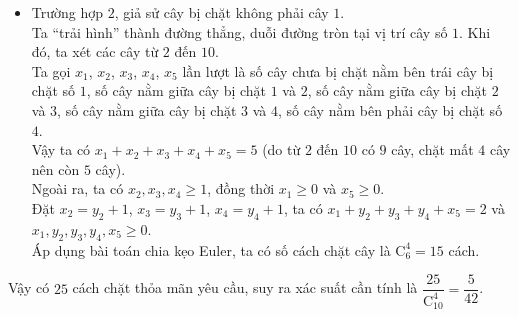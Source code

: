 \begin{ex}
{\begin{itemize}
			Gọi $x_1$, $x_2$, $x_3$, $x_4$ lần lượt là số lượng cây nằm ở giữa bốn cây bị chặt (chưa bao gồm cây $2$ và cây $10$). \\
			Vậy ta có $x_1+x_2+x_3+x_4=4$. Đồng thời $x_1\ge 0$, $x_2\ge 1$, $x_3\ge 1$ và $x_4\ge 0$ (do đã có cây $2$ và cây $10$ đứng cạnh cây $1$ bị chặt, nên $x_1$ và $x_4$ có thể bằng $0$ vẫn thỏa mãn yêu cầu đề bài). \\ 
			Đặt $x_2=y_2+1$, $x_3=y_3+1$, suy ra $x_1+y_2+y_3+x_4=2$ và $x_1,  y_2, y_3, x_4\ge 0$. \\
			Áp dụng bài toán chia kẹo Euler, ta có số cách chặt là $\mathrm{C}^3_5=10$ cách.
			\item Trường hợp $2$, giả sử cây bị chặt không phải cây $1$. \\
			Ta ``trải hình'' thành đường thẳng, duỗi đường tròn tại vị trí cây số $1$. Khi đó, ta xét các cây từ $2$ đến $10$. \\
			Ta gọi $x_1$, $x_2$, $x_3$, $x_4$, $x_5$ lần lượt là số cây chưa bị chặt nằm bên trái cây bị chặt số $1$, số cây nằm giữa cây bị chặt $1$ và $2$, số cây nằm giữa cây bị chặt $2$ và $3$, số cây nằm giữa cây bị chặt $3$ và $4$, số cây nằm bên phải cây bị chặt số $4$. \\
			Vậy ta có $x_1+x_2+x_3+x_4+x_5=5$ (do từ $2$ đến $10$ có $9$ cây, chặt mất $4$ cây nên còn $5$ cây). \\
			Ngoài ra, ta có $x_2, x_3, x_4\ge 1$, đồng thời $x_1\ge 0$ và $x_5\ge 0$. \\
			Đặt $x_2=y_2+1$, $x_3=y_3+1$, $x_4=y_4+1$, ta có $x_1+y_2+y_3+y_4+x_5=2$ và $x_1,y_2,y_3,y_4,x_5\ge 0$. \\
			Áp dụng bài toán chia kẹo Euler, ta có số cách chặt cây là $\mathrm{C}^4_6=15$ cách.
		\end{itemize}
		Vậy có $25$ cách chặt thỏa mãn yêu cầu, suy ra xác suất cần tính là $\dfrac{25}{\mathrm{C}^4_{10}}=\dfrac{5}{42}$.
	}
\end{ex}


